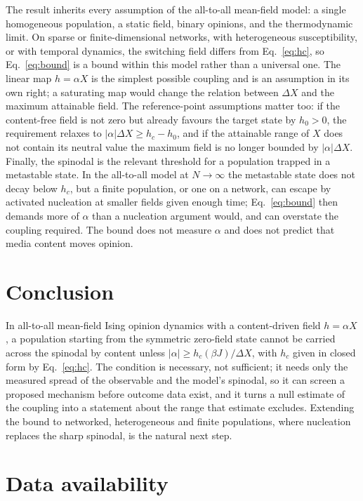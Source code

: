 \documentclass[preprint,12pt]{elsarticle}
\begin{document}
The result inherits every assumption of the all-to-all mean-field model: a single homogeneous
population, a static field, binary opinions, and the thermodynamic limit. On sparse or
finite-dimensional networks, with heterogeneous susceptibility, or with temporal dynamics,
the switching field differs from Eq.~\eqref{eq:hc}, so Eq.~\eqref{eq:bound} is a bound within
this model rather than a universal one. The linear map $h = \alpha X$ is the simplest possible
coupling and is an assumption in its own right; a saturating map would change the relation
between $\Delta X$ and the maximum attainable field. The reference-point assumptions matter
too: if the content-free field is not zero but already favours the target state by $h_0 > 0$,
the requirement relaxes to $|\alpha|\Delta X \ge h_c - h_0$, and if the attainable range of
$X$ does not contain its neutral value the maximum field is no longer bounded by
$|\alpha|\Delta X$. Finally, the spinodal is the relevant threshold for a population trapped
in a metastable state. In the all-to-all model at $N \to \infty$ the metastable state does not
decay below $h_c$, but a finite population, or one on a network, can escape by activated
nucleation at smaller fields given enough time; Eq.~\eqref{eq:bound} then demands more of
$\alpha$ than a nucleation argument would, and can overstate the coupling required. The bound
does not measure $\alpha$ and does not predict that media content moves opinion.

\section{Conclusion}
\label{sec:conclusion}

In all-to-all mean-field Ising opinion dynamics with a content-driven field $h = \alpha X$,
a population starting from the symmetric zero-field state cannot be carried across the
spinodal by content unless $|\alpha| \ge h_c(\beta J)/\Delta X$, with $h_c$ given in closed
form by Eq.~\eqref{eq:hc}. The condition is necessary, not sufficient; it needs only the
measured spread of the observable and the model's spinodal, so it can screen a proposed
mechanism before outcome data exist, and it turns a null estimate of the coupling into a
statement about the range that estimate excludes. Extending the bound to networked,
heterogeneous and finite populations, where nucleation replaces the sharp spinodal, is the
natural next step.

\section*{Data availability}
\end{document}
